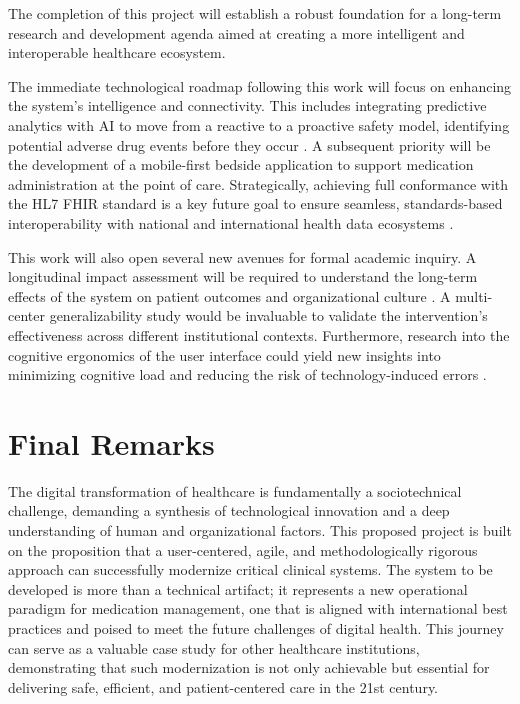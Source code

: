 The completion of this project will establish a robust foundation for a long-term research and development agenda aimed at creating a more intelligent and interoperable healthcare ecosystem.

The immediate technological roadmap following this work will focus on enhancing the system's intelligence and connectivity. This includes integrating predictive analytics with AI to move from a reactive to a proactive safety model, identifying potential adverse drug events before they occur \cite{bates2021,zhao2021}. A subsequent priority will be the development of a mobile-first bedside application to support medication administration at the point of care. Strategically, achieving full conformance with the HL7 FHIR standard is a key future goal to ensure seamless, standards-based interoperability with national and international health data ecosystems \cite{mandl2020}.

This work will also open several new avenues for formal academic inquiry. A longitudinal impact assessment will be required to understand the long-term effects of the system on patient outcomes and organizational culture \cite{greenhalgh2017}. A multi-center generalizability study would be invaluable to validate the intervention's effectiveness across different institutional contexts. Furthermore, research into the cognitive ergonomics of the user interface could yield new insights into minimizing cognitive load and reducing the risk of technology-induced errors \cite{holden2011}.

\section{Final Remarks}

The digital transformation of healthcare is fundamentally a sociotechnical challenge, demanding a synthesis of technological innovation and a deep understanding of human and organizational factors. This proposed project is built on the proposition that a user-centered, agile, and methodologically rigorous approach can successfully modernize critical clinical systems. The system to be developed is more than a technical artifact; it represents a new operational paradigm for medication management, one that is aligned with international best practices and poised to meet the future challenges of digital health. This journey can serve as a valuable case study for other healthcare institutions, demonstrating that such modernization is not only achievable but essential for delivering safe, efficient, and patient-centered care in the 21st century. 
